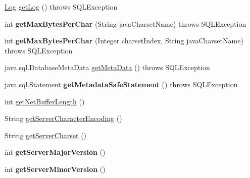 \begin{DoxyCompactItemize}
\item 
\mbox{\hyperlink{interfacecom_1_1mysql_1_1jdbc_1_1log_1_1_log}{Log}} \mbox{\hyperlink{classcom_1_1mysql_1_1jdbc_1_1_connection_impl_ae8304e8374b4789fe5f73120bccb7143}{get\+Log}} ()  throws S\+Q\+L\+Exception 
\item 
\mbox{\label{classcom_1_1mysql_1_1jdbc_1_1_connection_impl_a41dccda25e2c737cdd0de9354f7507dc}} 
int {\bfseries get\+Max\+Bytes\+Per\+Char} (String java\+Charset\+Name)  throws S\+Q\+L\+Exception 
\item 
\mbox{\label{classcom_1_1mysql_1_1jdbc_1_1_connection_impl_a6212780fb07799fb25654b231fc7fd70}} 
int {\bfseries get\+Max\+Bytes\+Per\+Char} (Integer charset\+Index, String java\+Charset\+Name)  throws S\+Q\+L\+Exception 
\item 
java.\+sql.\+Database\+Meta\+Data \mbox{\hyperlink{classcom_1_1mysql_1_1jdbc_1_1_connection_impl_aa16ed222f78d8d0202446aafb5330612}{get\+Meta\+Data}} ()  throws S\+Q\+L\+Exception 
\item 
\mbox{\label{classcom_1_1mysql_1_1jdbc_1_1_connection_impl_a577f3fb8cbe9a5efcbdf32e7c2de1370}} 
java.\+sql.\+Statement {\bfseries get\+Metadata\+Safe\+Statement} ()  throws S\+Q\+L\+Exception 
\item 
int \mbox{\hyperlink{classcom_1_1mysql_1_1jdbc_1_1_connection_impl_a3d522b6620717a4b7f9119a7931bec5e}{get\+Net\+Buffer\+Length}} ()
\item 
String \mbox{\hyperlink{classcom_1_1mysql_1_1jdbc_1_1_connection_impl_ac6f97840677e30fabce87c044819e2c1}{get\+Server\+Character\+Encoding}} ()
\item 
String \mbox{\hyperlink{classcom_1_1mysql_1_1jdbc_1_1_connection_impl_aec1bc6ca740ae9b75d6cad0f3126a276}{get\+Server\+Charset}} ()
\item 
\mbox{\label{classcom_1_1mysql_1_1jdbc_1_1_connection_impl_ab0232d093db786d63207e01de49fbea7}} 
int {\bfseries get\+Server\+Major\+Version} ()
\item 
\mbox{\label{classcom_1_1mysql_1_1jdbc_1_1_connection_impl_aa9315dc2d50a1e8124e2e6dc700e686f}} 
int {\bfseries get\+Server\+Minor\+Version} ()

\end{DoxyCompactItemize}
